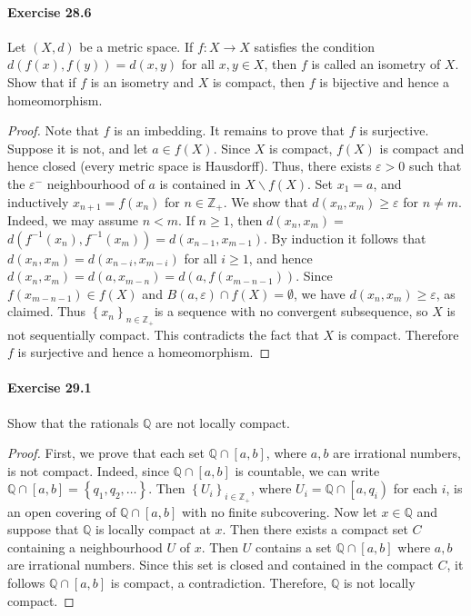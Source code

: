 \documentclass{article}
\begin{document}
\paragraph{Exercise 28.6} Let $(X, d)$ be a metric space. If $f: X \rightarrow X$ satisfies the condition $d(f(x), f(y))=d(x, y)$ for all $x, y \in X$, then $f$ is called an isometry of $X$. Show that if $f$ is an isometry and $X$ is compact, then $f$ is bijective and hence a homeomorphism.
\begin{proof}
    Note that $f$ is an imbedding. It remains to prove that $f$ is surjective. Suppose it is not, and let $a \in f(X)$. Since $X$ is compact, $f(X)$ is compact and hence closed (every metric space is Hausdorff). Thus, there exists $\varepsilon>0$ such that the $\varepsilon^{-}$ neighbourhood of $a$ is contained in $X \backslash f(X)$. Set $x_1=a$, and inductively $x_{n+1}=f\left(x_n\right)$ for $n \in \mathbb{Z}_{+}$. We show that $d\left(x_n, x_m\right) \geq \varepsilon$ for $n \neq m$. Indeed, we may assume $n<m$. If $n \geq 1$, then $d\left(x_n, x_m\right)=$ $d\left(f^{-1}\left(x_n\right), f^{-1}\left(x_m\right)\right)=d\left(x_{n-1}, x_{m-1}\right)$. By induction it follows that $d\left(x_n, x_m\right)=d\left(x_{n-i}, x_{m-i}\right)$ for all $i \geq 1$, and hence $d\left(x_n, x_m\right)=d\left(a, x_{m-n}\right)=d\left(a, f\left(x_{m-n-1}\right)\right)$. Since $f\left(x_{m-n-1}\right) \in f(X)$ and $B(a, \varepsilon) \cap f(X)=\emptyset$, we have $d\left(x_n, x_m\right) \geq \varepsilon$, as claimed. Thus $\left\{x_n\right\}_{n \in \mathbb{Z}_{+}}$is a sequence with no convergent subsequence, so $X$ is not sequentially compact. This contradicts the fact that $X$ is compact. Therefore $f$ is surjective and hence a homeomorphism.
\end{proof}



\paragraph{Exercise 29.1} Show that the rationals $\mathbb{Q}$ are not locally compact.
\begin{proof}
    First, we prove that each set $\mathbb{Q} \cap[a, b]$, where $a, b$ are irrational numbers, is not compact. Indeed, since $\mathbb{Q} \cap[a, b]$ is countable, we can write $\mathbb{Q} \cap[a, b]=\left\{q_1, q_2, \ldots\right\}$. Then $\left\{U_i\right\}_{i \in \mathbb{Z}_{+}}$, where $U_i=\mathbb{Q} \cap\left[a, q_i\right)$ for each $i$, is an open covering of $\mathbb{Q} \cap[a, b]$ with no finite subcovering. Now let $x \in \mathbb{Q}$ and suppose that $\mathbb{Q}$ is locally compact at $x$. Then there exists a compact set $C$ containing a neighbourhood $U$ of $x$. Then $U$ contains a set $\mathbb{Q} \cap[a, b]$ where $a, b$ are irrational numbers. Since this set is closed and contained in the compact $C$, it follows $\mathbb{Q} \cap[a, b]$ is compact, a contradiction. Therefore, $\mathbb{Q}$ is not locally compact.
\end{proof}
\end{document}
